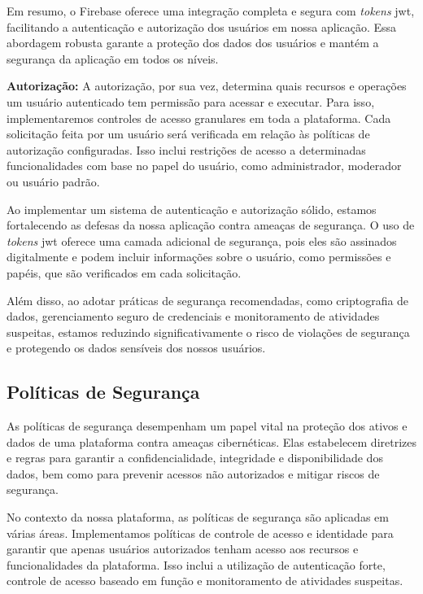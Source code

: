 Em resumo, o Firebase oferece uma integração completa e segura com \textit{tokens} \acs{jwt}, facilitando a autenticação e autorização dos usuários em nossa aplicação. Essa abordagem robusta garante a proteção dos dados dos usuários e mantém a segurança da aplicação em todos os níveis.

\textbf{Autorização:}
A autorização, por sua vez, determina quais recursos e operações um usuário autenticado tem permissão para acessar e executar. Para isso, implementaremos controles de acesso granulares em toda a plataforma. Cada solicitação feita por um usuário será verificada em relação às políticas de autorização configuradas. Isso inclui restrições de acesso a determinadas funcionalidades com base no papel do usuário, como administrador, moderador ou usuário padrão.

Ao implementar um sistema de autenticação e autorização sólido, estamos fortalecendo as defesas da nossa aplicação contra ameaças de segurança. O uso de \textit{tokens} \acs{jwt} oferece uma camada adicional de segurança, pois eles são assinados digitalmente e podem incluir informações sobre o usuário, como permissões e papéis, que são verificados em cada solicitação.

Além disso, ao adotar práticas de segurança recomendadas, como criptografia de dados, gerenciamento seguro de credenciais e monitoramento de atividades suspeitas, estamos reduzindo significativamente o risco de violações de segurança e protegendo os dados sensíveis dos nossos usuários.

\subsection{Políticas de Segurança}

As políticas de segurança desempenham um papel vital na proteção dos ativos e dados de uma plataforma contra ameaças cibernéticas. Elas estabelecem diretrizes e regras para garantir a confidencialidade, integridade e disponibilidade dos dados, bem como para prevenir acessos não autorizados e mitigar riscos de segurança.

No contexto da nossa plataforma, as políticas de segurança são aplicadas em várias áreas. Implementamos políticas de controle de acesso e identidade para garantir que apenas usuários autorizados tenham acesso aos recursos e funcionalidades da plataforma. Isso inclui a utilização de autenticação forte, controle de acesso baseado em função e monitoramento de atividades suspeitas.

